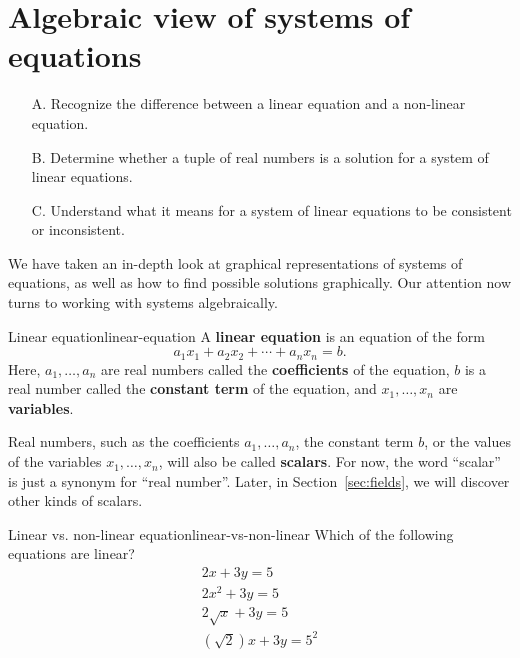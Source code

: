 \section{Algebraic view of systems of equations}

\begin{outcome}
  \begin{enumerate}
  \item[A.] Recognize the difference between a linear equation and a
    non-linear equation.
  \item[B.] Determine whether a tuple of real numbers is a solution
    for a system of linear equations.
  \item[C.] Understand what it means for a system of linear equations
    to be consistent or inconsistent.
  \end{enumerate}
\end{outcome}

We have taken an in-depth look at graphical representations of systems of equations, as well as how to find possible
solutions graphically. Our attention now turns to working with systems algebraically. 

\begin{definition}{Linear equation}{linear-equation}
A \textbf{linear equation} is an equation of
the form
\begin{equation*}
  a_1x_1 + a_2x_2 + \cdots + a_nx_n = b.
\end{equation*}
Here, $a_1,\ldots,a_n$ are real numbers called the
\textbf{coefficients} of the equation, $b$ is a
real number called the \textbf{constant term}
of the equation, and $x_1,\ldots,x_n$ are
\textbf{variables}.
\end{definition}

Real numbers, such as the coefficients $a_1,\ldots,a_n$, the constant
term $b$, or the values of the variables $x_1,\ldots,x_n$, will also
be called \textbf{scalars}. For now, the word
``scalar'' is just a synonym for ``real number''. Later, in
Section~\ref{sec:fields}, we will discover other kinds of scalars. 

\begin{example}{Linear vs. non-linear equation}{linear-vs-non-linear}
  Which of the following equations are linear?
  \begin{equation*}
    \begin{array}{c}
      2x+3y=5\\
      2x^2+3y=5\\
      2\sqrt{x} + 3y = 5\\
      (\sqrt{2}) x + 3y = 5^2
    \end{array}
  \end{equation*}
\end{example}

